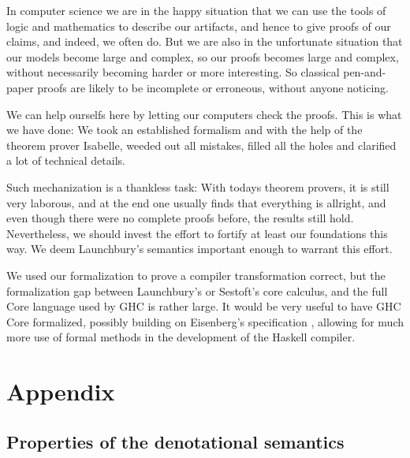 \documentclass{jfp1}
\theoremstyle{nonumberbreak}
\begin{document}
In computer science we are in the happy situation that we can use the tools of logic and mathematics to describe our artifacts, and hence to give proofs of our claims, and indeed, we often do. But we are also in the unfortunate situation that our models become large and complex, so our proofs becomes large and complex, without necessarily becoming harder or more interesting. So classical pen-and-paper proofs are likely to be incomplete or erroneous, without anyone noticing.

We can help ourselfs here by letting our computers check the proofs. This is what we have done: We took an established formalism and with the help of the theorem prover Isabelle, weeded out all mistakes, filled all the holes and clarified a lot of technical details.

Such mechanization is a thankless task: With todays theorem provers, it is still very laborous, and at the end one usually finds that everything is allright, and even though there were no complete proofs before, the results still hold. Nevertheless, we should invest the effort to fortify at least our foundations this way. We deem Launchbury’s semantics important enough to warrant this effort.

\smallskip

We used our formalization to prove a compiler transformation correct, but the formalization gap between Launchbury’s or Sestoft’s core calculus, and the full Core language used by GHC is rather large. It would be very useful to have GHC Core formalized, possibly building on Eisenberg’s specification , allowing for much more use of formal methods in the development of the Haskell compiler.






\appendix

\section{Appendix}
\subsection{Properties of the denotational semantics}
\label{updsemanticsprops}
\end{document}
